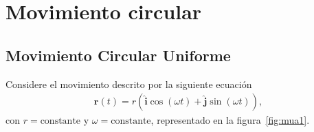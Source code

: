 
\chapter{Movimiento circular}
\label{chap:cin1}










\section{Movimiento Circular Uniforme}

Considere el movimiento descrito por la siguiente ecuaci\'on
\begin{align}
  \label{eq:mua}
  \mathbf{r}(t)=r\left(\hat{\mathbf{i}}\cos(\omega t)+\hat{\mathbf{j}}\sin(\omega t)\right),
\end{align}
con $r=\text{constante}$ y $\omega=\text{constante}$, representado en la figura~\ref{fig:mua1}.

